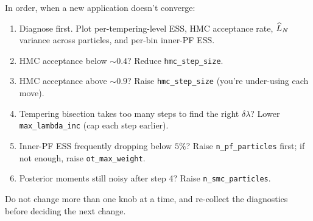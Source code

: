In order, when a new application doesn't converge:
\begin{enumerate}
  \item Diagnose first. Plot per-tempering-level ESS, HMC acceptance
        rate, $\widehat{L}_N$ variance across particles, and
        per-bin inner-PF ESS.
  \item HMC acceptance below $\sim 0.4$? Reduce
        \texttt{hmc\_step\_size}.
  \item HMC acceptance above $\sim 0.9$? Raise
        \texttt{hmc\_step\_size} (you're under-using each move).
  \item Tempering bisection takes too many steps to find the right
        $\delta\lambda$? Lower \texttt{max\_lambda\_inc} (cap each
        step earlier).
  \item Inner-PF ESS frequently dropping below $5\%$? Raise
        \texttt{n\_pf\_particles} first; if not enough, raise
        \texttt{ot\_max\_weight}.
  \item Posterior moments still noisy after step 4? Raise
        \texttt{n\_smc\_particles}.
\end{enumerate}
Do not change more than one knob at a time, and re-collect the
diagnostics before deciding the next change.
